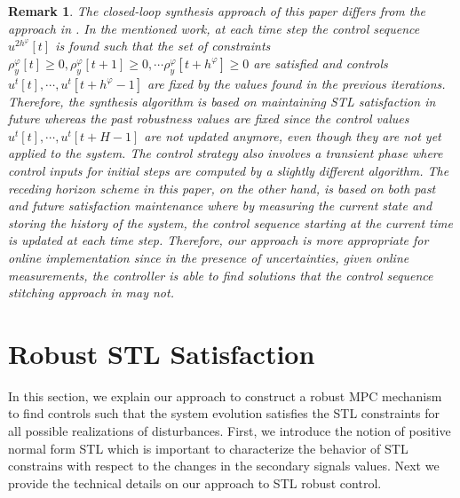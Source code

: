 \documentclass[letterpaper, 10 pt, conference]{ieeeconf}
\newtheorem{remark}{Remark}
\begin{document}
\begin{remark}
The closed-loop synthesis approach of this paper differs from the approach in \cite{raman2015reactive}. In the mentioned work, at each time step the control sequence $u^{2h^\varphi}[t]$ is found such that the set of constraints $\rho_y^\varphi[t] \geq 0, \rho_y^\varphi[t+1] \geq 0,\cdots \rho_y^\varphi[t+h^\varphi] \geq 0$ are satisfied and controls $u^t[t],\cdots,u^t[t+h^\varphi-1]$ are fixed by the values found in the previous iterations. Therefore, the synthesis algorithm is based on maintaining STL satisfaction in future whereas the past robustness values are fixed since the control values $u^t[t],\cdots,u^t[t+H-1]$ are not updated anymore, even though they are not yet applied to the system. The control strategy also involves a transient phase where control inputs for initial steps are computed by a slightly different algorithm.
The receding horizon scheme in this paper, on the other hand, is based on both past and future satisfaction maintenance where by measuring the current state and storing the history of the system, the control sequence starting at the current time is updated at each time step. Therefore, our approach is more appropriate for online implementation since in the presence of uncertainties, given online measurements, the controller is able to find solutions that the control sequence stitching approach in \cite{raman2015reactive} may not. 
\end{remark}





















\section{Robust STL Satisfaction}
\label{sec:robust}

In this section, we explain our approach to construct a robust MPC mechanism to find controls such that the system evolution satisfies the STL constraints for all possible realizations of disturbances. First, we introduce the notion of positive normal form STL which is important to characterize the behavior of STL constrains with respect to the changes in the secondary signals values. Next we provide the technical details on our approach to STL robust control. 
\end{document}
